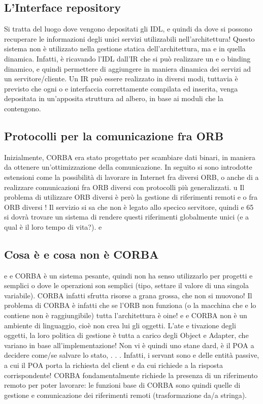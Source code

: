\documentclass[a4paper,12pt]{article}
\begin{document}
\subsection{L'Interface repository}
Si tratta del luogo dove vengono depositati gli IDL, e quindi da dove si possono
recuperare le informazioni degli unici servizi utilizzabili nell'architettura!
Questo sistema non è utilizzato nella gestione statica dell'architettura, ma
e
in quella dinamica. Infatti, è ricavando l'IDL dall'IR che si può realizzare un
e
o
binding dinamico, e quindi permettere di aggiungere in maniera dinamica dei
servizi ad un servitore/cliente.
Un IR può essere realizzato in diversi modi, tuttavia è previsto che ogni
o
e
interfaccia correttamente compilata ed inserita, venga depositata in un'apposita
struttura ad albero, in base ai moduli che la contengono.
\subsection{Protocolli per la comunicazione fra ORB}
Inizialmente, CORBA era stato progettato per scambiare dati binari, in maniera
da ottenere un'ottimizzazione della comunicazione. In seguito si sono introdotte
estensioni come la possibilità di lavorare in Internet fra diversi ORB, o anche di
a
realizzare comunicazioni fra ORB diversi con protocolli più generalizzati.
u
Il problema di utilizzare ORB diversi è però la gestione di riferimenti remoti
e
o
fra ORB diversi ! Il servizio si sa che non è legato allo specico servitore, quindi
e
65
si dovrà trovare un sistema di rendere questi riferimenti globalmente unici (e
a
qual è il loro tempo di vita?).
e
\subsection{Cosa è e cosa non è CORBA}
e
e
CORBA è un sistema pesante, quindi non ha senso utilizzarlo per progetti
e
semplici o dove le operazioni son semplici (tipo, settare il valore di una singola
variabile). CORBA infatti sfrutta risorse a grana grossa, che non si muovono!
Il problema di CORBA è infatti che se l'ORB non funziona (o la macchina che
e
lo contiene non è raggiungibile) tutta l'architettura è oine!
e
e
CORBA non è un ambiente di linguaggio, cioè non crea lui gli oggetti. L'ate
e
tivazione degli oggetti, la loro politica di gestione è tutta a carico degli Object
e
Adapter, che variano in base all'implementazione! Non vi è quindi uno stane
dard, è il POA a decidere come/se salvare lo stato, . . . Infatti, i servant sono
e
delle entità passive, a cui il POA porta la richiesta del client e da cui richiede
a
la risposta corrispondente!
CORBA fondamentalmente richiede la presenza di un riferimento remoto
per poter lavorare: le funzioni base di CORBA sono quindi quelle di gestione e
comunicazione dei riferimenti remoti (trasformazione da/a stringa).
\end{document}
